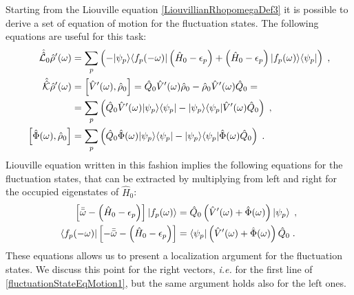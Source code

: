 \documentclass[a4paper]{article}
\newcommand{\eps}{\epsilon}
\newcommand{\bbomega}{{\bar{\bar\omega}}}
\newcommand{\nn}{\notag}
\newcommand{\lb}{\label}
\newcommand{\op}[1]{\hat {#1}}
\newcommand{\sop}[1]{\op{\op {#1}}}
\newcommand{\commutator}[2]{\left[ {#1} , {#2} \right]}
\newcommand{\ketbra}[2]{| #1 \rangle \langle #2 |}
\newcommand{\dmnot}{\op{\rho}_0}
\newcommand{\dm}{\op{\rho}}
\newcommand{\hnot}{\op{H}_0}
\newcommand{\Liouvnot}{\sop{\mathcal L_0}}
\newcommand{\coupl}{\sop{\mathcal K}}
\begin{document}
Starting from the Liouville equation \eqref{LiouvillianRhopomegaDef3} it is possible to derive a set of equation of motion for the fluctuation states. 
The following equations are useful for this task: 
\begin{align}
\Liouvnot\dm'(\omega) & = \sum_p\left(-\ketbra{\psi_p}{f_p(-\omega)}\left(\hnot-\eps_p\right) + \left(\hnot-\eps_p\right)\ketbra{f_p(\omega)}{\psi_p}\right) \;, \nn \\
\coupl\dm'(\omega) &= \commutator{\op V'(\omega)}{\dmnot} = \op Q_0 \op V'(\omega) \dmnot - \dmnot \op V'(\omega) \op Q_0 = \nn \\
& = \sum_p\left( \op Q_0 \op V'(\omega) \ketbra{\psi_p}{\psi_p} - \ketbra{\psi_p}{\psi_p} \op V'(\omega) \op Q_0 \right) \;, \nn \\
\commutator{\op \Phi(\omega)}{\dmnot} & =  \sum_p\left( \op Q_0 \op \Phi(\omega) \ketbra{\psi_p}{\psi_p} - \ketbra{\psi_p}{\psi_p} \op \Phi(\omega) \op Q_0 \right) \;. \nn
\end{align} 
Liouville equation written in this fashion implies the following equations for the fluctuation states, that can be extracted by multiplying from left and right for the 
occupied eigenstates of $\hnot$:
\begin{align}\lb{fluctuationStateEqMotion1}
\left[\bbomega - \left(\hnot-\eps_p\right)\right]\ket{f_p(\omega)} &= \op Q_0\left(\op V'(\omega) + \op \Phi(\omega)\right)\ket{\psi_p} \;, \nn \\
\bra{f_p(-\omega)}\left[-\bbomega - \left(\hnot-\eps_p\right)\right] &= \bra{\psi_p}\left(\op V'(\omega) + \op \Phi(\omega)\right)\op Q_0 \;.
\end{align}
These equations allows us to present a localization argument for the fluctuation states. We discuss this point for the right vectors, \emph{i.e.} for the first line of 
\eqref{fluctuationStateEqMotion1}, but the same argument holds also for the left ones. 
\end{document}
